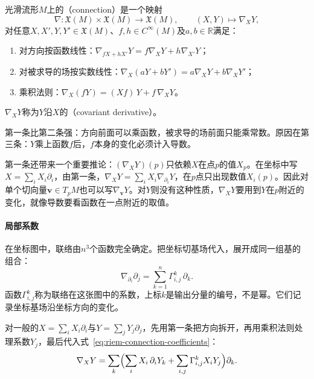 \begin{definition}[联络与协变导数]
\label{def:riem-connection}
光滑流形$M$上的（connection）是一个映射
\begin{equation}
\nabla:\mathfrak X(M)\times\mathfrak X(M)\to\mathfrak X(M),\qquad(X,Y)\mapsto\nabla_XY,
\label{eq:riem-connection-map}
\end{equation}
对任意$X,X',Y,Y'\in\mathfrak X(M)$、$f,h\in C^\infty(M)$及$a,b\in\mathbb R$满足：
\begin{enumerate}
\item 对方向按函数线性：$\nabla_{fX+hX'}Y=f\nabla_XY+h\nabla_{X'}Y$；
\item 对被求导的场按实数线性：$\nabla_X(aY+bY')=a\nabla_XY+b\nabla_XY'$；
\item 乘积法则：$\nabla_X(fY)=(Xf)\,Y+f\,\nabla_XY$。
\end{enumerate}
$\nabla_XY$称为$Y$沿$X$的（covariant derivative）。
\end{definition}

第一条比第二条强：方向前面可以乘函数，被求导的场前面只能乘常数。原因在第三条：$Y$乘上函数$f$后，$f$本身的变化必须计入导数。

第一条还带来一个重要推论：$(\nabla_XY)(p)$只依赖$X$在点$p$的值$X_p$。在坐标中写$X=\sum_iX_i\partial_i$，由第一条，$\nabla_XY=\sum_iX_i\nabla_{\partial_i}Y$，在$p$点只出现数值$X_i(p)$。因此对单个切向量$\bm v\in T_pM$也可以写$\nabla_{\bm v}Y$。对$Y$则没有这种性质，$\nabla_XY$要用到$Y$在$p$附近的变化，就像导数要看函数在一点附近的取值。

\paragraph{局部系数}
在坐标图中，联络由$n^3$个函数完全确定。把坐标切基场代入，展开成同一组基的组合：
\begin{equation}
\nabla_{\partial_i}\partial_j=\sum_{k=1}^n\Gamma^k_{i,j}\,\partial_k .
\label{eq:riem-connection-coefficients}
\end{equation}
函数$\Gamma^k_{i,j}$称为联络在这张图中的系数，上标$k$是输出分量的编号，不是幂。它们记录坐标基场沿坐标方向的变化。

对一般的$X=\sum_iX_i\partial_i$与$Y=\sum_jY_j\partial_j$，先用第一条把方向拆开，再用乘积法则处理系数$Y_j$，最后代入式~\eqref{eq:riem-connection-coefficients}：
\begin{equation}
\nabla_XY=\sum_k\Bigl(\sum_iX_i\,\partial_iY_k+\sum_{i,j}\Gamma^k_{i,j}X_iY_j\Bigr)\partial_k .
\label{eq:riem-covariant-derivative-coordinates}
\end{equation}

